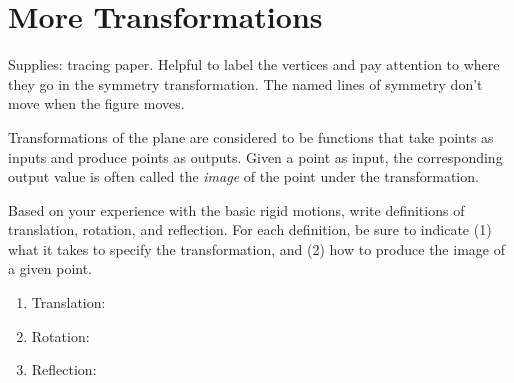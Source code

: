 \newpage

\section{More Transformations}
\begin{teachingnote}
Supplies:  tracing paper.  Helpful to label the vertices and pay attention to where they go in the symmetry transformation.  The named lines of symmetry don't move when the figure moves.
\end{teachingnote}

Transformations of the plane are considered to be functions that take points as inputs and produce 
points as outputs.  Given a point as input, the corresponding output value is often called 
the \emph{image} of the point under the transformation.
\begin{prob}
Based on your experience with the basic rigid motions, write definitions of translation, rotation, and reflection. For each definition, be sure to indicate (1) what it takes to specify the transformation, and (2) how to produce the image of a given point.  
\begin{enumerate}
\item Translation: 
\vspace{0.3in}
\item Rotation: 
\vspace{0.3in}
\item Reflection: 
\vspace{0.3in}
\end{enumerate}
\end{prob}

